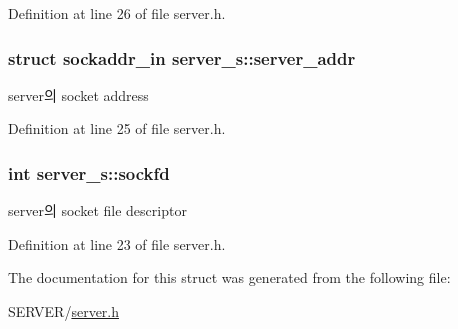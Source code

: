 Definition at line 26 of file server.\-h.

\hypertarget{structserver__s_aa49ed3594b99b1da4de179995dfa553d}{
\subsubsection[{server\-\_\-addr}]{\setlength{\rightskip}{0pt plus 5cm}struct sockaddr\-\_\-in server\-\_\-s\-::server\-\_\-addr}}\label{structserver__s_aa49ed3594b99b1da4de179995dfa553d}


server의 socket address 



Definition at line 25 of file server.\-h.

\hypertarget{structserver__s_a7109ed4db0376f7de840d82c4379099d}{
\subsubsection[{sockfd}]{\setlength{\rightskip}{0pt plus 5cm}int server\-\_\-s\-::sockfd}}\label{structserver__s_a7109ed4db0376f7de840d82c4379099d}


server의 socket file descriptor 



Definition at line 23 of file server.\-h.



The documentation for this struct was generated from the following file\-:\begin{DoxyCompactItemize}
\item 
S\-E\-R\-V\-E\-R/\hyperlink{server_8h}{server.\-h}\end{DoxyCompactItemize}
